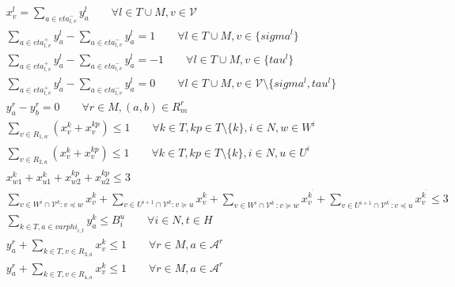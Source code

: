 \begin{align}
  & x_{v}^{l} = \sum_{a \in \mathit{eta}_{l,v}^{-}} y_{a}^{l} \qquad \forall l \in T \cup M, v \in \mathcal{V} \tag{eq\_0001} \\
  & \sum_{a \in \mathit{eta}_{l,v}^{+}} y_{a}^{l} - \sum_{a \in \mathit{eta}_{l,v}^{-}} y_{a}^{l} = 1 \qquad \forall l \in T \cup M, v \in \{\mathit{sigma}^{l}\} \tag{eq\_0002\_a} \\
  & \sum_{a \in \mathit{eta}_{l,v}^{+}} y_{a}^{l} - \sum_{a \in \mathit{eta}_{l,v}^{-}} y_{a}^{l} = -1 \qquad \forall l \in T \cup M, v \in \{\mathit{tau}^{l}\} \tag{eq\_0002\_b} \\
  & \sum_{a \in \mathit{eta}_{l,v}^{+}} y_{a}^{l} - \sum_{a \in \mathit{eta}_{l,v}^{-}} y_{a}^{l} = 0 \qquad \forall l \in T \cup M, v \in \mathcal{V} \setminus \{\mathit{sigma}^{l}, \mathit{tau}^{l}\} \tag{eq\_0002\_c} \\
  & y_{a}^{r} - y_{b}^{r} = 0 \qquad \forall r \in M, (a, b) \in R_{m}^{r} \tag{eq\_0003} \\
  & \sum_{v \in R_{1,w}} (x_{v}^{k} + x_{v}^{kp}) \leq 1 \qquad \forall k \in T, kp \in T \setminus \{k\}, i \in N, w \in W^{i} \tag{eq\_0004} \\
  & \sum_{v \in R_{2,u}} (x_{v}^{k} + x_{v}^{kp}) \leq 1 \qquad \forall k \in T, kp \in T \setminus \{k\}, i \in N, u \in U^{i} \tag{eq\_0005} \\
  & x_{w1}^{k} + x_{u1}^{k} + x_{w2}^{kp} + x_{u2}^{kp} \leq 3 \tag{eq\_0006} \\
  & \sum_{v \in W^{i} \cap \mathcal{V}^{k} : v \preceq w} x_{v}^{k} + \sum_{v \in U^{i + 1} \cap \mathcal{V}^{k} : v \succeq u} x_{v}^{k} + \underset{v \in W^{i} \cap \mathcal{V}^{k^{^{'}}} : v \succeq w}{\sum} x_{v}^{k^{^{'}}} + \underset{v \in U^{i + 1} \cap \mathcal{V}^{k^{^{'}}} : v \preceq u}{\sum} x_{v}^{k^{^{'}}} \leq 3 \tag{eq\_0007} \\
  & \sum_{k \in T, a \in \mathit{varphi}_{i,t}} y_{a}^{k} \leq B_{i}^{u} \qquad \forall i \in N, t \in H \tag{eq\_0008} \\
  & y_{a}^{r} + \sum_{k \in T, v \in R_{3,a}} x_{v}^{k} \leq 1 \qquad \forall r \in M, a \in \mathcal{A}^{r} \tag{eq\_0009} \\
  & y_{a}^{r} + \sum_{k \in T, v \in R_{4,a}} x_{v}^{k} \leq 1 \qquad \forall r \in M, a \in \mathcal{A}^{r} \tag{eq\_0010} \\

\end{align}
